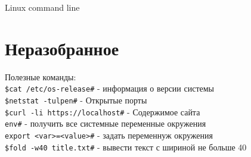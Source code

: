 \documentclass[12pt, a4paper]{article}
\newcommand{\cci}[2]{\indent\texttt{#1\indent \#} - #2 \\}
\begin{document}
	
	\begin{center} {\Huge Linux command line} \end{center}

	
	
	
	
	
	
	
	
	
	
	
	
	
	

\section{Неразобранное}
\noindent Полезные команды: \\
\cci{\$cat /etc/os-release}{информация о версии системы}
\cci{\$netstat -tulpen}{Открытые порты}
\cci{\$curl -li https://localhost}{Содержимое сайта}
\cci{env}{получить все системные переменные окружения}
\cci{export <var>=<value>}{задать переменнуж окружения}
\cci{\$fold -w40 title.txt}{вывести текст с шириной не больше 40}
	
\end{document}
